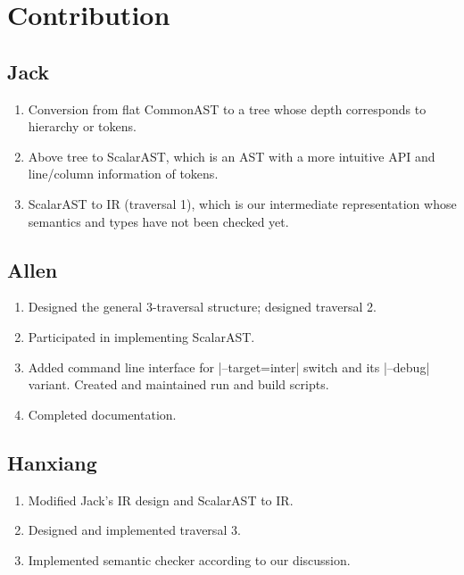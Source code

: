 \section{Contribution}

\subsection{Jack}
\begin{enumerate}
    \item Conversion from flat CommonAST to a tree whose depth corresponds to hierarchy or tokens.
    \item Above tree to ScalarAST, which is an AST with a more intuitive API and line/column information of tokens.
    \item ScalarAST to IR (traversal 1), which is our intermediate representation whose semantics and types have not been checked yet.
\end{enumerate}

\subsection{Allen}
\begin{enumerate}
    \item Designed the general 3-traversal structure; designed traversal 2.
    \item Participated in implementing ScalarAST.
    \item Added command line interface for |--target=inter| switch and its |--debug| variant. Created and maintained run and build scripts.
    \item Completed documentation.
\end{enumerate}

\subsection{Hanxiang}
\begin{enumerate}
    \item Modified Jack's IR design and ScalarAST to IR.
    \item Designed and implemented traversal 3.
    \item Implemented semantic checker according to our discussion.
\end{enumerate}